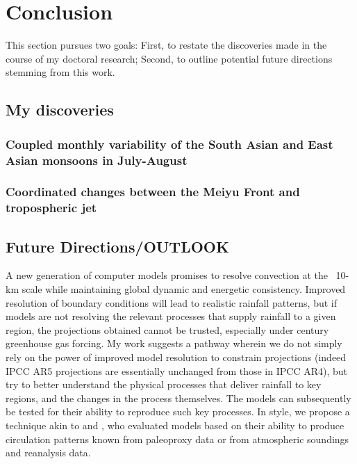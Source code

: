 \chapter{Conclusion}

This section pursues two goals: First, to restate the discoveries made in the course of my doctoral research; Second, to outline potential future directions stemming from this work.

\section{My discoveries}

\subsection{Coupled monthly variability of the South Asian and East Asian monsoons in July-August}

\subsection{Coordinated changes between the Meiyu Front and tropospheric jet}

\section{Future Directions/OUTLOOK}

	A new generation of computer models promises to resolve convection at the ~10-km scale while maintaining global dynamic and energetic consistency. Improved resolution of boundary conditions will lead to realistic rainfall patterns, but if models are not resolving the relevant processes that supply rainfall to a given region, the projections obtained cannot be trusted, especially under  century greenhouse gas forcing. My work suggests a pathway wherein we do not simply rely on the power of improved model resolution to constrain projections (indeed IPCC AR5 projections are essentially unchanged from those in IPCC AR4), but try to better understand the physical processes that deliver rainfall to key regions, and the changes in the process themselves. The models can subsequently be tested for their ability to reproduce such key processes. In style, we propose a technique akin to \cite{Boos} and \cite{Tierney}, who evaluated models based on their ability to produce circulation patterns known from paleoproxy data or from atmospheric soundings and reanalysis data.
	

